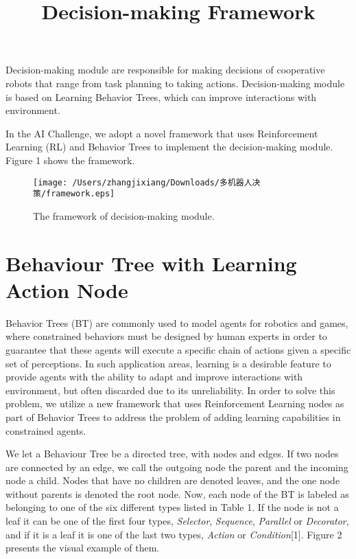 \documentclass[a4paper,12pt]{article}
\author{}
\date{}
\title{Decision-making Framework}
\begin{document}
\maketitle

{\LARGE Decision-making module are responsible for making decisions of cooperative robots that range from task planning to taking actions. Decision-making module is based on Learning Behavior Trees, which can improve interactions with environment.}


In the AI Challenge, we adopt a novel framework that uses Reinforcement Learning (RL) and Behavior Trees to implement the decision-making module. Figure 1 shows the framework.

\begin{figure}[tbph!]
	\centering
	\texttt{[image: /Users/zhangjixiang/Downloads/多机器人决策/framework.eps]}
	\caption{The framework of decision-making module.}
	\label{fig:framework}
\end{figure}

\section{Behaviour Tree with Learning Action Node}
Behavior Trees (BT) are commonly used to model agents for robotics and games, where constrained behaviors must be designed by human experts in order to guarantee that these agents will execute a specific chain of actions given a specific set of perceptions. In such application areas, learning is a desirable feature to provide agents with the ability to adapt and improve interactions with environment, but often discarded due to its unreliability. In order to solve this problem, we utilize a new framework that uses Reinforcement Learning nodes as part of Behavior Trees to address the problem of adding learning capabilities in constrained agents.

We let a Behaviour Tree be a directed tree, with nodes and edges. If two nodes are connected by an edge, we call the outgoing node the parent and the incoming node a child. Nodes that have no children are denoted leaves, and the one node without parents is denoted the root node. Now, each node of the BT is labeled as belonging to one of the six different types listed in Table 1. If the node is not a leaf it can be one of the first four types, \textit{Selector}, \textit{Sequence}, \textit{Parallel} or \textit{Decorator}, and if it is a leaf it is one of the last two types, \textit{Action} or \textit{Condition}[1]. Figure 2 presents the visual example of them.
\end{document}
